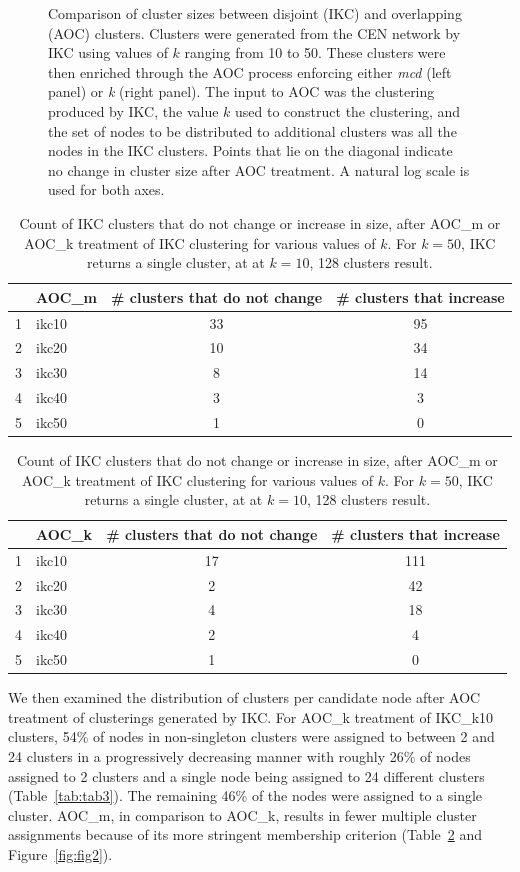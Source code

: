 \documentclass[12pt, oneside]{article}   	%
\begin{document}
\begin{figure}[H]
\begin{subfigure}[t]{0.48\textwidth}
        	\end{subfigure}
\captionsetup{width=0.9\textwidth}	
\caption{Comparison of cluster sizes between disjoint (IKC)  and overlapping (AOC) clusters. Clusters were generated from the CEN network by IKC using values of $k$ ranging from 10 to 50. These clusters were then enriched through the AOC process enforcing either \emph{mcd} (left panel) or \emph{k} (right panel). The input to AOC was the  clustering produced by 
IKC, the value $k$ used to construct the clustering, and the set of nodes to be distributed to additional clusters was all the nodes in the IKC clusters.  Points that lie on the diagonal indicate no change in cluster size after AOC treatment. A natural log scale is used for both axes.}
\label{fig:fig1}
\end{figure}

\begin{table}[H]
\centering
\begin{tabular}{rlcc}
  \hline
 & AOC\_m & \# clusters that do not change & \# clusters that increase\\ 
  \hline
1 & ikc10 &  33 &  95 \\ 
2 & ikc20 &  10 &  34 \\ 
3 & ikc30 &   8 &  14 \\ 
4 & ikc40 &   3 &   3 \\ 
5 & ikc50 &   1 &   0 \\ 
   \hline
\end{tabular}
\quad
\begin{tabular}{rlcc}
  \hline
 & AOC\_k& \# clusters that do not change & \# clusters that increase \\ 
  \hline
1 & ikc10 &  17 & 111 \\ 
2 & ikc20 &   2 &  42 \\ 
3 & ikc30 &   4 &  18 \\ 
4 & ikc40 &   2 &   4 \\ 
5 & ikc50 &   1 &   0 \\ 
   \hline
\end{tabular}
\captionsetup{width=0.9\textwidth}
\caption{Count of IKC clusters that do not change or increase in size, after AOC\_m or AOC\_k treatment of IKC clustering for various values of $k$. For $k=50$, IKC returns a single cluster, at at $k=10$, 128 clusters result.}
\label{tab:tab2}
\end{table}

We then examined the distribution of clusters per candidate node after AOC treatment of clusterings generated by  IKC. For AOC\_k treatment of IKC\_k10 clusters, 54\% of nodes in non-singleton clusters were assigned to between 2 and 24 clusters in a progressively decreasing manner with roughly 26\% of nodes assigned to 2 clusters and a single node being assigned to 24 different clusters (Table~\ref{tab:tab3}). 
The remaining 46\% of the nodes were assigned to a single cluster. 
AOC\_m, in comparison to AOC\_k, results in fewer multiple cluster assignments because of its more stringent membership criterion (Table~\ref{tab:tab2} and Figure~\ref{fig:fig2}).
\end{document}
